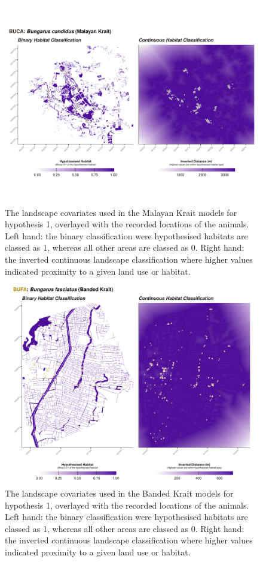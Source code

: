\documentclass[10pt,a4paper]{article}
\begin{document}
\begin{figure}
\includegraphics[width=1\linewidth]{../../figures/landscape_plot_BUCA_H1} \caption{The landscape covariates used in the Malayan Krait models for hypothesis 1, overlayed with the recorded locations of the animals. Left hand: the binary classification were hypothesised habitats are classed as 1, whereas all other areas are classed as 0. Right hand: the inverted continuous landscape classification where higher values indicated proximity to a given land use or habitat.}\label{fig:landscapePlotBUCA1}
\end{figure}

\begin{figure}
\includegraphics[width=1\linewidth]{../../figures/landscape_plot_BUFA_H1} \caption{The landscape covariates used in the Banded Krait models for hypothesis 1, overlayed with the recorded locations of the animals. Left hand: the binary classification were hypothesised habitats are classed as 1, whereas all other areas are classed as 0. Right hand: the inverted continuous landscape classification where higher values indicated proximity to a given land use or habitat.}\label{fig:landscapePlotBUFA1}
\end{figure}
\end{document}
